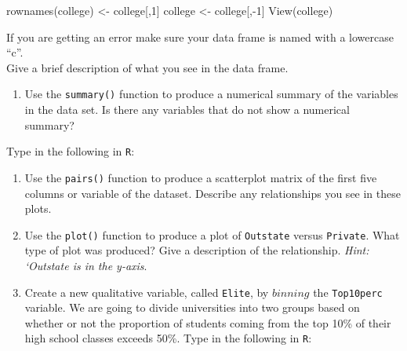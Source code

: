 \documentclass[
]{article}
\newenvironment{Shaded}{\begin{snugshade}}{\end{snugshade}}
\newcommand{\DecValTok}[1]{\textcolor[rgb]{0.00,0.00,0.81}{#1}}
\newcommand{\FunctionTok}[1]{\textcolor[rgb]{0.00,0.00,0.00}{#1}}
\newcommand{\NormalTok}[1]{#1}
\newcommand{\OtherTok}[1]{\textcolor[rgb]{0.56,0.35,0.01}{#1}}
\newcommand{\SpecialCharTok}[1]{\textcolor[rgb]{0.00,0.00,0.00}{#1}}
\providecommand{\tightlist}{%
  \setlength{\itemsep}{0pt}\setlength{\parskip}{0pt}}
\begin{document}
\begin{Shaded}
\begin{Highlighting}[]
\FunctionTok{rownames}\NormalTok{(college) }\OtherTok{\textless{}{-}}\NormalTok{ college[,}\DecValTok{1}\NormalTok{]}
\NormalTok{college }\OtherTok{\textless{}{-}}\NormalTok{ college[,}\SpecialCharTok{{-}}\DecValTok{1}\NormalTok{]}
\FunctionTok{View}\NormalTok{(college)}
\end{Highlighting}
\end{Shaded}

If you are getting an error make sure your data frame is named with a
lowercase ``c''.\\
Give a brief description of what you see in the data frame.

\begin{enumerate}
\def\labelenumi{\alph{enumi})}
\setcounter{enumi}{2}
\tightlist
\item
  Use the \texttt{summary()} function to produce a numerical summary of
  the variables in the data set. Is there any variables that do not show
  a numerical summary?
\end{enumerate}

Type in the following in \texttt{R}:

\begin{Shaded}
\end{Shaded}

\begin{enumerate}
\def\labelenumi{\alph{enumi})}
\setcounter{enumi}{3}
\tightlist
\item
  Use the \texttt{pairs()} function to produce a scatterplot matrix of
  the first five columns or variable of the dataset. Describe any
  relationships you see in these plots.\\
\item
  Use the \texttt{plot()} function to produce a plot of
  \texttt{Outstate} versus \texttt{Private}. What type of plot was
  produced? Give a description of the relationship. \emph{Hint:
  `Outstate is in the y-axis}.\\
\item
  Create a new qualitative variable, called \texttt{Elite}, by
  \(binning\) the \texttt{Top10perc} variable. We are going to divide
  universities into two groups based on whether or not the proportion of
  students coming from the top 10\% of their high school classes exceeds
  50\%. Type in the following in \texttt{R}:
\end{enumerate}
\end{document}
